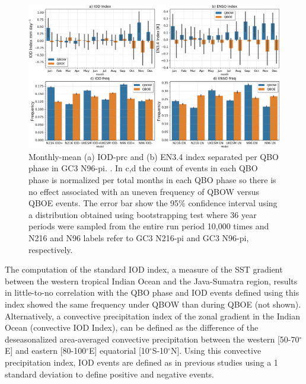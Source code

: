 \begin{figure}[t!]
\centering
 \noindent
 \includegraphics[width=\linewidth]{figures/iod_barplot.png}
\caption[IOD and ENSO frequency changes on QBO phase.]{ Monthly-mean (a) IOD-prc and (b) EN3.4 index separated per QBO phase in GC3 N96-pi. . In c,d the count of events in each QBO phase is normalized per total months in each QBO phase so there is no effect associated with an uneven frequency of QBOW versus QBOE events. The error bar show the 95\% confidence interval using a distribution obtained using bootstrapping test where 36 year periods were sampled from the entire run period  10,000 times  and N216 and N96 labels refer to GC3 N216-pi and GC3 N96-pi, respectively.}
\label{fig:iod_barplot}
\end{figure}

The computation of the standard IOD index, a measure of the SST gradient between the western tropical Indian Ocean and the Java-Sumatra region, results in little-to-no correlation with the QBO phase and IOD events defined using this index showed the same frequency under QBOW than during QBOE (not shown). 
Alternatively, a convective precipitation index of the zonal gradient in the Indian Ocean (convective IOD Index), can be defined as the difference of the deseasonalized area-averaged convective precipitation between the western [50-70$^\circ$E] and eastern [80-100$^\circ$E] equatorial [10$^\circ$S-10$^\circ$N]. 
Using this convective precipitation index, IOD events are defined as in previous studies using a 1 standard deviation to define positive and negative events. 


